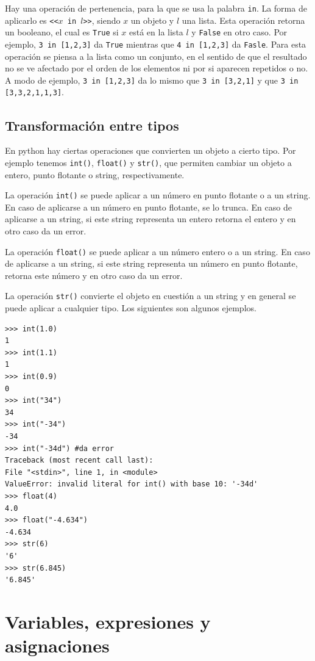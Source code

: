 \documentclass[a4paper, 12pt]{report}
\theoremstyle{definition}
\begin{document}
Hay una operación de pertenencia, para la que se usa la palabra {\tt in}. La forma de aplicarlo es {\tt <<$x$ in $l$>>}, siendo $x$ un objeto y $l$ una lista. Esta operación retorna un booleano, el cual es {\tt True} si $x$ está en la lista $l$ y {\tt False} en otro caso. Por ejemplo, {\tt 3 in [1,2,3]} da {\tt True} mientras que {\tt 4 in [1,2,3]} da {\tt Fasle}. Para esta operación se piensa a la lista como un conjunto, en el sentido de que el resultado no se ve afectado por el orden de los elementos ni por si aparecen repetidos o no. A modo de ejemplo, {\tt 3 in [1,2,3]} da lo mismo que {\tt 3 in [3,2,1]} y que {\tt 3 in [3,3,2,1,1,3]}.

\subsection{Transformación entre tipos}\label{sec-TransfTipos}

En python hay ciertas operaciones que convierten un objeto a cierto tipo. Por ejemplo tenemos {\tt int()}, {\tt float()} y {\tt str()}, que permiten cambiar un objeto a entero, punto flotante o string, respectivamente.

La operación {\tt int()} se puede aplicar a un número en punto flotante o a un string. En caso de aplicarse a un número en punto flotante, se lo trunca. En caso de aplicarse a un string, si este string representa un entero retorna el entero y en otro caso da un error.

La operación {\tt float()} se puede aplicar a un número entero o a un string. En caso de aplicarse a un string, si este string representa un número en punto flotante, retorna este número y en otro caso da un error.

La operación {\tt str()} convierte el objeto en cuestión a un string y en general se puede aplicar a cualquier tipo. Los siguientes son algunos ejemplos.
\begin{verbatim}
>>> int(1.0)
1
>>> int(1.1)
1
>>> int(0.9)
0
>>> int("34")
34
>>> int("-34")
-34
>>> int("-34d") #da error
Traceback (most recent call last):
File "<stdin>", line 1, in <module>
ValueError: invalid literal for int() with base 10: '-34d'
>>> float(4)
4.0
>>> float("-4.634")
-4.634
>>> str(6)
'6'
>>> str(6.845)
'6.845'
\end{verbatim}

\section{Variables, expresiones y asignaciones}
\end{document}
